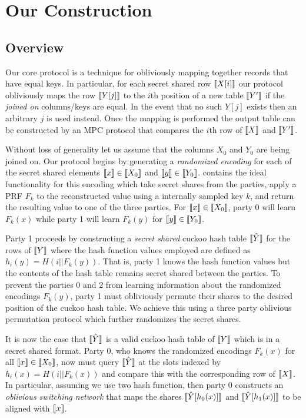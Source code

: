 \section{Our Construction}\label{sec:construction}



\subsection{Overview}

Our core protocol is a technique for obliviously mapping together records that have equal keys. In particular, for each secret shared row $\llbracket X[i]\rrbracket$ our protocol obliviously maps the row $\llbracket Y[j]\rrbracket$ to the $i$th position of a new table $\llbracket Y'\rrbracket$ if the \emph{joined on} columns/keys are equal. In the event that no such $Y[j]$ exists then an arbitrary $j$ is used instead. Once the mapping is performed the output table can be constructed by an MPC protocol\cite{aby3} that compares the $i$th row of $\llbracket X\rrbracket$ and $\llbracket Y'\rrbracket$. 

Without loss of generality let us assume that the columns $X_0$ and $Y_0$ are being joined on. Our protocol begins by generating a \emph{randomized encoding} for each of the secret shared elements $\llbracket x\rrbracket\in \llbracket X_0\rrbracket$ and $ \llbracket y\rrbracket\in \llbracket Y_0\rrbracket$.  contains the ideal functionality for this encoding which take secret shares from the parties, apply a PRF $F_k$ to the reconstructed value using a internally sampled key $k$, and return the resulting value to one of the three parties. For $\llbracket x\rrbracket\in \llbracket X_0\rrbracket$, party 0 will learn $F_k(x)$ while party 1 will learn $F_k(y)$ for $\llbracket y\rrbracket\in \llbracket Y_0\rrbracket$.

Party 1 proceeds by constructing a \emph{secret shared} cuckoo hash table $\llbracket \hat Y\rrbracket$ for the rows of $\llbracket Y\rrbracket$ where the hash function values employed are defined as $h_i(y) = H( i || F_k(y))$. That is, party 1 knows the hash function values but the contents of the hash table remains secret shared between the parties. To prevent the parties 0 and 2 from learning information about the randomized encodings $F_k(y)$, party 1 must obliviously permute their shares to the desired position of the cuckoo hash table. We achieve this using a three party oblivious permutation protocol which further randomizes the secret shares.

It is now the case that $\llbracket \hat Y\rrbracket$ is a valid cuckoo hash table of $\llbracket Y\rrbracket$ which is in a secret shared format. Party 0, who knows the randomized encodings $F_k(x)$ for all $\llbracket x\rrbracket\in \llbracket X_0\rrbracket$, now must query $\llbracket \hat Y\rrbracket$ at the slots indexed by $h_i(x)= H( i || F_k(x))$ and compare this with the corresponding row of $\llbracket X\rrbracket$. In particular, assuming we use two hash function, then party 0 constructs an \emph{oblivious switching network} that maps the shares $\llbracket \hat Y[{h_0(x)}]\rrbracket$ and $\llbracket \hat Y[{h_1(x)}]\rrbracket$ to be aligned with $\llbracket x\rrbracket$.

